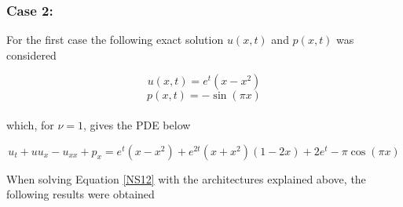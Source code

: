 \documentclass[12pt,letterpaper]{article}
\begin{document}
\subsubsection*{Case 2:}

For the first case the following exact solution $u(x,t)$ and $p(x,t)$ was considered

$$u(x,t) = e^{t}(x-x^2)$$
$$p(x,t) = -\sin(\pi x)$$\\

which, for $\nu=1$, gives the PDE below

\begin{equation}
  \label{NS12}
  u_t + u u_x - u_{xx} + p_x = e^t (x-x^2) + e^{2t} (x+x^2) (1-2x) + 2e^t -\pi\cos(\pi x)
\end{equation}

When solving Equation \ref{NS12} with the architectures explained above, the following results were obtained
\end{document}
